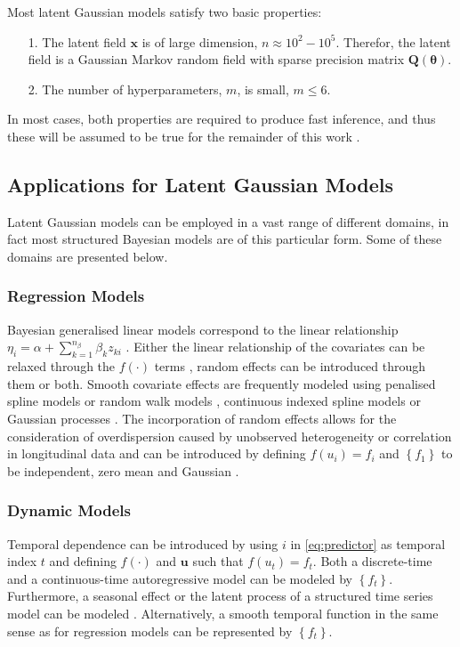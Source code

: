 Most latent Gaussian models satisfy two basic properties:
\begin{itemize}
    \item[1.] The latent field $\pmb{x}$ is of large dimension, $n\approx10^2-10^5$. Therefor, the latent field is a Gaussian Markov random field with sparse precision matrix $\pmb{Q}\left(\pmb{\theta}\right)$.
    \item[2.] The number of hyperparameters, $m$, is small, $m\leq6$.
\end{itemize}
In most cases, both properties are required to produce fast inference, and thus these will be assumed to be true for the remainder of this work \autocite[][]{rue2009approximate}.
\subsection{Applications for Latent Gaussian Models}
Latent Gaussian models can be employed in a vast range of different domains, in fact most structured Bayesian models are of this particular form. Some of these domains are presented below.
\subsubsection*{Regression Models}
Bayesian generalised linear models correspond to the linear relationship $\eta_i=\alpha+\sum_{k=1}^{n_\beta}\beta_k z_{ki}$ \autocite[][]{dey2000generalized}. Either the linear relationship of the covariates can be relaxed through the $f\left(\cdot\right)$ terms \autocite[][]{fahrmeir2013multivariate}, random effects can be introduced through them or both. Smooth covariate effects are frequently modeled using penalised spline models \autocite[][]{lang2004bayesian} or random walk models \autocite[][]{fahrmeir2013multivariate}, continuous indexed spline models \autocite[][]{rue2005gaussian} or Gaussian processes \autocite[][]{chu2005gaussian}. The incorporation of random effects allows for the consideration of overdispersion caused by unobserved heterogeneity or correlation in longitudinal data and can be introduced by defining $f\left(u_i\right)=f_i$ and $\left\lbrace f_1\right\rbrace$ to be independent, zero mean and Gaussian \autocite[][]{fahrmeir2001bayesian}.
\subsubsection*{Dynamic Models}
Temporal dependence can be introduced by using $i$ in \eqref{eq:predictor} as temporal index $t$ and defining $f\left(\cdot\right)$ and $\pmb{u}$ such that $f\left(u_t\right)=f_t$. Both a discrete-time and a continuous-time autoregressive model can be modeled by $\left\lbrace f_t\right\rbrace$. Furthermore, a seasonal effect or the latent process of a structured time series model can be modeled \autocite[][]{kitagawa1996smoothness}. Alternatively, a smooth temporal function in the same sense as for regression models can be represented by $\left\lbrace f_t\right\rbrace$.

